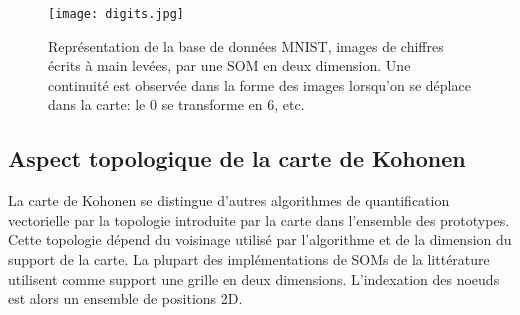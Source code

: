 \documentclass[../main]{subfiles}
\begin{document}



\begin{figure}
\centering
\texttt{[image: digits.jpg]}
\caption{Représentation de la base de données MNIST, images de chiffres écrits à main levées, par une SOM en deux dimension. Une continuité est observée dans la forme des images lorsqu'on se déplace dans la carte: le $0$ se transforme en $6$, etc.}
\label{fig:SOM}
\end{figure}

\subsection{Aspect topologique de la carte de Kohonen}

La carte de Kohonen se distingue d'autres algorithmes de quantification vectorielle par la topologie introduite par la carte dans l'ensemble des prototypes. Cette topologie dépend du voisinage utilisé par l'algorithme et de la dimension du support de la carte.
La plupart des implémentations de SOMs de la littérature utilisent comme support une grille en deux dimensions. L'indexation des noeuds est alors un ensemble de positions 2D.
\end{document}
